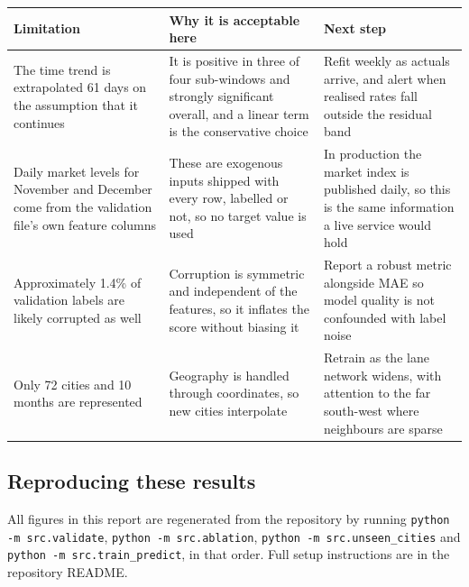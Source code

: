 \documentclass[11pt,a4paper]{article}
\begin{document}
\begin{table}[H]
\small
\begin{tabularx}{\textwidth}{L{0.27\textwidth}L{0.33\textwidth}X}
\toprule
\textbf{Limitation} & \textbf{Why it is acceptable here} & \textbf{Next step} \\
\midrule
The time trend is extrapolated 61 days on the assumption that it continues & It is positive in three of four sub-windows and strongly significant overall, and a linear term is the conservative choice & Refit weekly as actuals arrive, and alert when realised rates fall outside the residual band \\
Daily market levels for November and December come from the validation file's own feature columns & These are exogenous inputs shipped with every row, labelled or not, so no target value is used & In production the market index is published daily, so this is the same information a live service would hold \\
Approximately 1.4\% of validation labels are likely corrupted as well & Corruption is symmetric and independent of the features, so it inflates the score without biasing it & Report a robust metric alongside MAE so model quality is not confounded with label noise \\
Only 72 cities and 10 months are represented & Geography is handled through coordinates, so new cities interpolate & Retrain as the lane network widens, with attention to the far south-west where neighbours are sparse \\
\bottomrule
\end{tabularx}
\end{table}

\subsection*{Reproducing these results}

All figures in this report are regenerated from the repository by running
\texttt{python -m src.validate}, \texttt{python -m src.ablation},
\texttt{python -m src.unseen\_cities} and \texttt{python -m src.train\_predict},
in that order. Full setup instructions are in the repository README.
\end{document}
